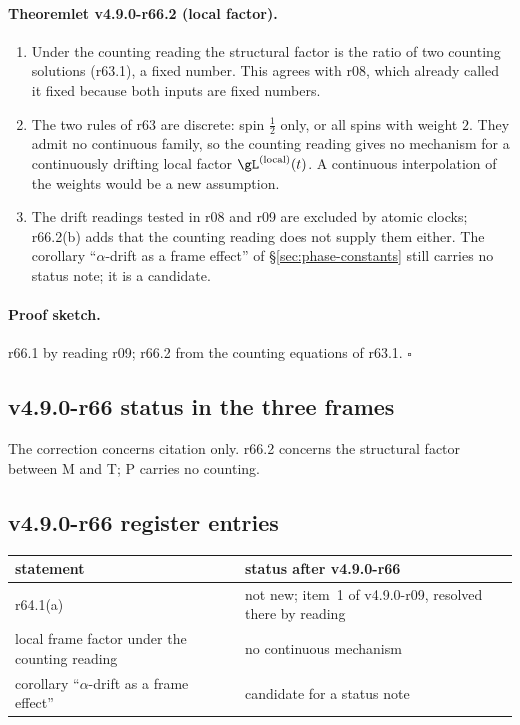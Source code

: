\paragraph{Theoremlet v4.9.0-r66.2 (local factor).}
\begin{enumerate}[leftmargin=2em]
\item[(a)] Under the counting reading the structural factor is the ratio of two counting solutions (r63.1), a fixed number.  This agrees with r08, which already
called it fixed because both inputs are fixed numbers.
\item[(b)] The two rules of r63 are discrete: spin \(\tfrac12\) only, or all spins with weight \(2\).  They admit no continuous family, so the counting reading gives no
mechanism for a continuously drifting local factor \(\gL^{(\mathrm{local})}(t)\).  A continuous interpolation of the weights would be a new assumption.
\item[(c)] The drift readings tested in r08 and r09 are excluded by atomic clocks; r66.2(b) adds that the counting reading does not supply them either.  The
corollary ``\(\alpha\)-drift as a frame effect'' of \S\ref{sec:phase-constants} still carries no status note; it is a candidate.
\end{enumerate}

\paragraph{Proof sketch.}
r66.1 by reading r09; r66.2 from the counting equations of r63.1.  \(\square\)

\subsection*{v4.9.0-r66 status in the three frames}
\label{subsec:v490-r66-frames}

The correction concerns citation only.  r66.2 concerns the structural factor between M and T; P carries no counting.

\subsection*{v4.9.0-r66 register entries}
\label{subsec:v490-r66-register}

\begin{center}
\small
\begin{tabular}{@{}>{\raggedright\arraybackslash}p{}>{\raggedright\arraybackslash}p{}@{}}
\toprule
statement & status after v4.9.0-r66\\
\midrule
r64.1(a) & not new; item~1 of v4.9.0-r09, resolved there by reading\\
local frame factor under the counting reading & no continuous mechanism\\
corollary ``\(\alpha\)-drift as a frame effect'' & candidate for a status note\\
\bottomrule
\end{tabular}
\end{center}

